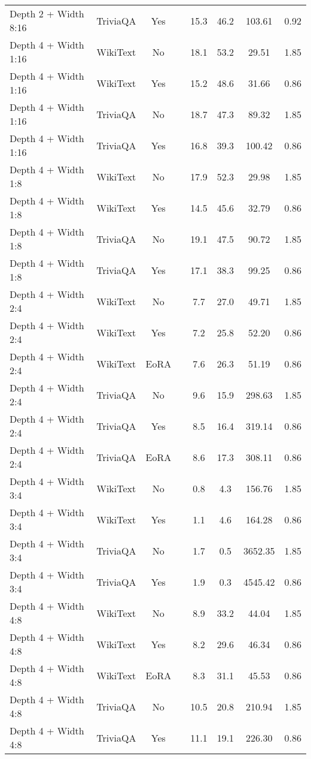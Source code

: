 \begin{longtable}{lcclcccc}
Depth 2 + Width 8:16 & TriviaQA & Yes & & 15.3 & 46.2 & 103.61 & 0.92 \\
Depth 4 + Width 1:16 & WikiText & No & & 18.1 & 53.2 & 29.51 & 1.85 \\
Depth 4 + Width 1:16 & WikiText & Yes & & 15.2 & 48.6 & 31.66 & 0.86 \\
Depth 4 + Width 1:16 & TriviaQA & No & & 18.7 & 47.3 & 89.32 & 1.85 \\
Depth 4 + Width 1:16 & TriviaQA & Yes & & 16.8 & 39.3 & 100.42 & 0.86 \\
Depth 4 + Width 1:8 & WikiText & No & & 17.9 & 52.3 & 29.98 & 1.85 \\
Depth 4 + Width 1:8 & WikiText & Yes & & 14.5 & 45.6 & 32.79 & 0.86 \\
Depth 4 + Width 1:8 & TriviaQA & No & & 19.1 & 47.5 & 90.72 & 1.85 \\
Depth 4 + Width 1:8 & TriviaQA & Yes & & 17.1 & 38.3 & 99.25 & 0.86 \\
Depth 4 + Width 2:4 & WikiText & No & & 7.7 & 27.0 & 49.71 & 1.85 \\
Depth 4 + Width 2:4 & WikiText & Yes & & 7.2 & 25.8 & 52.20 & 0.86 \\
Depth 4 + Width 2:4 & WikiText & EoRA & & 7.6 & 26.3 & 51.19 & 0.86 \\
Depth 4 + Width 2:4 & TriviaQA & No & & 9.6 & 15.9 & 298.63 & 1.85 \\
Depth 4 + Width 2:4 & TriviaQA & Yes & & 8.5 & 16.4 & 319.14 & 0.86 \\
Depth 4 + Width 2:4 & TriviaQA & EoRA & & 8.6 & 17.3 & 308.11 & 0.86 \\
Depth 4 + Width 3:4 & WikiText & No & & 0.8 & 4.3 & 156.76 & 1.85 \\
Depth 4 + Width 3:4 & WikiText & Yes & & 1.1 & 4.6 & 164.28 & 0.86 \\
Depth 4 + Width 3:4 & TriviaQA & No & & 1.7 & 0.5 & 3652.35 & 1.85 \\
Depth 4 + Width 3:4 & TriviaQA & Yes & & 1.9 & 0.3 & 4545.42 & 0.86 \\
Depth 4 + Width 4:8 & WikiText & No & & 8.9 & 33.2 & 44.04 & 1.85 \\
Depth 4 + Width 4:8 & WikiText & Yes & & 8.2 & 29.6 & 46.34 & 0.86 \\
Depth 4 + Width 4:8 & WikiText & EoRA & & 8.3 & 31.1 & 45.53 & 0.86 \\
Depth 4 + Width 4:8 & TriviaQA & No & & 10.5 & 20.8 & 210.94 & 1.85 \\
Depth 4 + Width 4:8 & TriviaQA & Yes & & 11.1 & 19.1 & 226.30 & 0.86 \\

\end{longtable}
